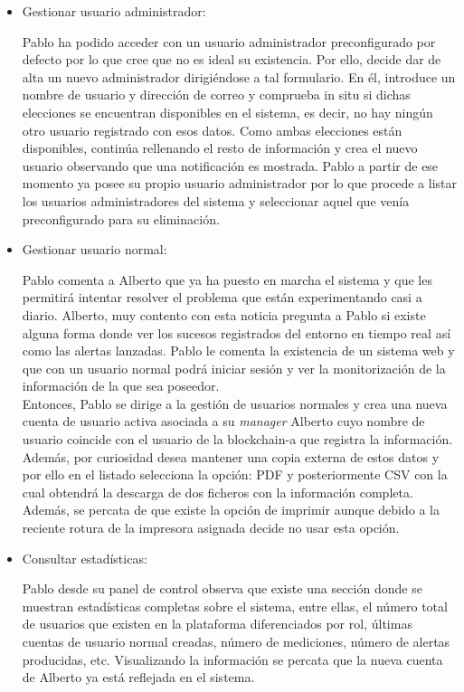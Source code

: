 \documentclass[12pt,a4paper, twoside]{report}
\begin{document}
\begin{itemize}
		\item Gestionar usuario administrador:
		
		Pablo ha podido acceder con un usuario administrador preconfigurado por defecto por lo que cree que no es ideal su existencia. Por ello, decide dar de alta un nuevo administrador dirigiéndose a tal formulario. En él, introduce un nombre de usuario y dirección de correo y comprueba in situ si dichas elecciones se encuentran disponibles en el sistema, es decir, no hay ningún otro usuario registrado con esos datos. Como ambas elecciones están disponibles, continúa rellenando el resto de información y crea el nuevo usuario observando que una notificación es mostrada. Pablo a partir de ese momento ya posee su propio usuario administrador por lo que procede a listar los usuarios administradores del sistema y seleccionar aquel que venía preconfigurado para su eliminación.
					
		\item Gestionar usuario normal:
		
		Pablo comenta a Alberto que ya ha puesto en marcha el sistema y que les permitirá intentar resolver el problema que están experimentando casi a diario. Alberto, muy contento con esta noticia pregunta a Pablo si existe alguna forma donde ver los sucesos registrados del entorno en tiempo real así como las alertas lanzadas. Pablo le comenta la existencia de un sistema web y que con un usuario normal podrá iniciar sesión y ver la monitorización de la información de la que sea poseedor. \\
		
		Entonces, Pablo se dirige a la gestión de usuarios normales y crea una nueva cuenta de usuario activa asociada a su \textit{manager} Alberto cuyo nombre de usuario coincide con el usuario de la \gls{blockchain-a} que registra la información. Además, por curiosidad desea mantener una copia externa de estos datos y por ello en el listado selecciona la opción: PDF y posteriormente CSV con la cual obtendrá la descarga de dos ficheros con la información completa. Además, se percata de que existe la opción de imprimir aunque debido a la reciente rotura de la impresora asignada decide no usar esta opción.
		
		\item Consultar estadísticas:
		
		Pablo desde su panel de control observa que existe una sección donde se muestran estadísticas completas sobre el sistema, entre ellas, el número total de usuarios que existen en la plataforma diferenciados por rol, últimas cuentas de usuario normal creadas, número de mediciones, número de alertas producidas, etc. Visualizando la información se percata que la nueva cuenta de Alberto ya está reflejada en el sistema.
		

\end{itemize}
\end{document}
